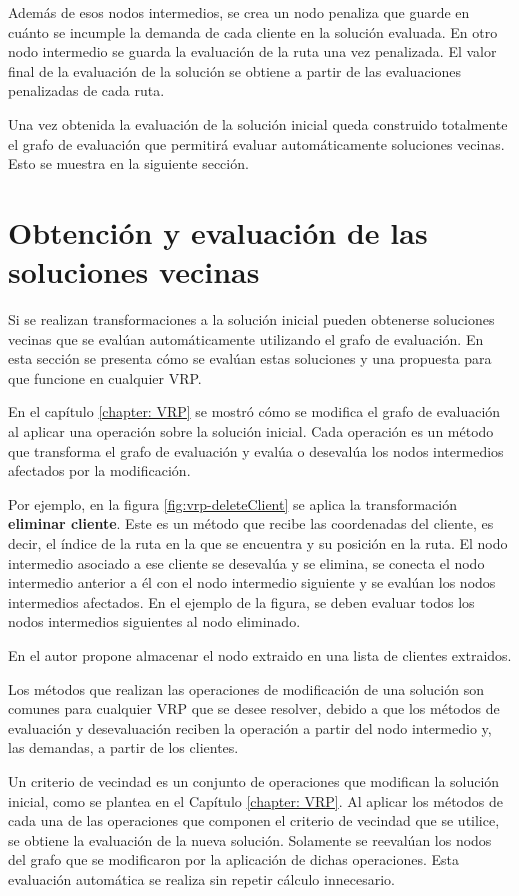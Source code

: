 Además de esos nodos intermedios, se crea un nodo penaliza que guarde en cuánto se incumple la demanda de cada cliente en la solución evaluada. En otro nodo intermedio se guarda la evaluación de la ruta una vez penalizada. El valor final de la evaluación de la solución se obtiene a partir de las evaluaciones penalizadas de cada ruta.

Una vez obtenida la evaluación de la solución inicial queda construido totalmente el grafo de evaluación que permitirá evaluar automáticamente soluciones vecinas. Esto se muestra en la siguiente sección.

\section{Obtención y evaluación de las soluciones vecinas} \label{3:neighbor-solutions}

Si se realizan transformaciones a la solución inicial pueden obtenerse soluciones vecinas que se evalúan automáticamente utilizando el grafo de evaluación. En esta sección se presenta cómo se evalúan estas soluciones y una propuesta para que funcione en cualquier VRP.

En el capítulo \ref{chapter: VRP} se mostró cómo se modifica el grafo de evaluación al aplicar una operación sobre la solución inicial. Cada operación es un método que transforma el grafo de evaluación y evalúa o desevalúa los nodos intermedios afectados por la modificación.

Por ejemplo, en la figura \ref{fig:vrp-deleteClient} se aplica la transformación \textbf{eliminar cliente}. Este es un método que recibe las coordenadas del cliente, es decir, el índice de la ruta en la que se encuentra y su posición en la ruta. El nodo intermedio asociado a ese cliente se desevalúa y se elimina, se conecta el nodo intermedio anterior a él con el nodo intermedio siguiente y se evalúan los nodos intermedios afectados. En el ejemplo de la figura, se deben evaluar todos los nodos intermedios siguientes al nodo eliminado.

En \cite{JJ} el autor propone almacenar el nodo extraido en una lista de clientes extraidos.

Los métodos que realizan las operaciones de modificación de una solución son comunes para cualquier VRP que se desee resolver, debido a que los métodos de evaluación y desevaluación reciben la operación a partir del nodo intermedio y, las demandas, a partir de los clientes. 

Un criterio de vecindad es un conjunto de operaciones que modifican la solución inicial, como se plantea en el Capítulo \ref{chapter: VRP}. Al aplicar los métodos de cada una de las operaciones que componen el criterio de vecindad que se utilice, se obtiene la evaluación de la nueva solución. Solamente se reevalúan los nodos del grafo que se modificaron por la aplicación de dichas operaciones. Esta evaluación automática se realiza sin repetir cálculo innecesario.

